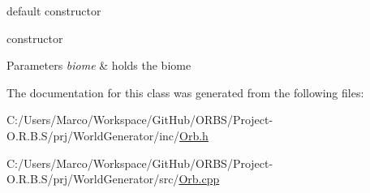 default constructor 

constructor


\begin{DoxyParams}{Parameters}
{\em biome} & holds the biome \\
\hline
\end{DoxyParams}


The documentation for this class was generated from the following files\-:\begin{DoxyCompactItemize}
\item 
C\-:/\-Users/\-Marco/\-Workspace/\-Git\-Hub/\-O\-R\-B\-S/\-Project-\/\-O.\-R.\-B.\-S/prj/\-World\-Generator/inc/\hyperlink{_orb_8h}{Orb.\-h}\item 
C\-:/\-Users/\-Marco/\-Workspace/\-Git\-Hub/\-O\-R\-B\-S/\-Project-\/\-O.\-R.\-B.\-S/prj/\-World\-Generator/src/\hyperlink{_orb_8cpp}{Orb.\-cpp}\end{DoxyCompactItemize}
